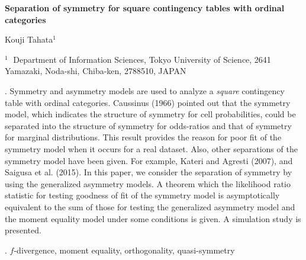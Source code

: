 \documentclass[12pt]{article}
\begin{document}
\begin{flushleft}


{\LARGE\bf Separation of symmetry for square contingency tables with ordinal categories}


\vspace{1.0cm}

Kouji Tahata$^1$
\begin{description}

\item $^1 \;$ Department of Information Sciences, Tokyo University of Science,
2641 Yamazaki, Noda-shi, Chiba-ken, 2788510, JAPAN

\end{description}

\end{flushleft}


\vspace{0.75cm}

. Symmetry and asymmetry models are used to analyze a {\it square} contingency table with ordinal categories.
Caussinus (1966) pointed out that the symmetry model, which indicates the structure of symmetry for cell probabilities, could be separated into the structure of symmetry for odds-ratios and that of symmetry for marginal distributions.
This result provides the reason for poor fit of the symmetry model when it occurs for a real dataset.
Also, other separations of the symmetry model have been given.
For example, Kateri and Agresti (2007), and Saigusa et al. (2015).
In this paper, we consider the separation of symmetry by using the generalized asymmetry models.
A theorem which the likelihood ratio statistic for testing goodness of fit of the symmetry model is asymptotically equivalent to the sum of those for testing the generalized asymmetry model and the moment equality model under some conditions is given.
A simulation study is presented.

\vskip 2mm

.
$f$-divergence, moment equality, orthogonality, quasi-symmetry
\end{document}
